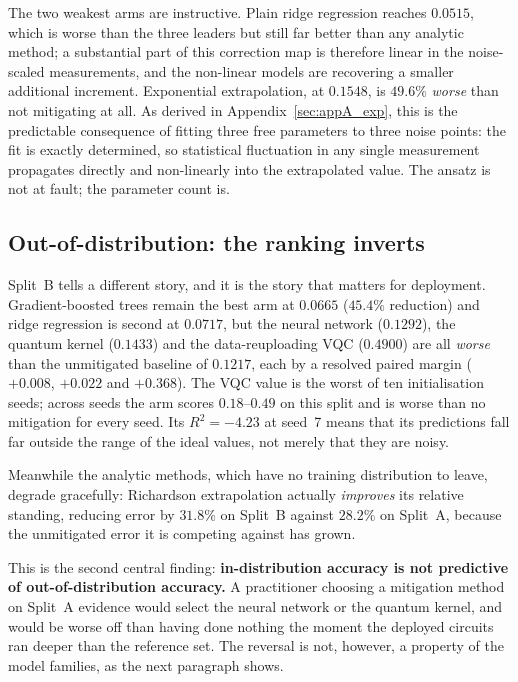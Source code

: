 \documentclass[Thesis.tex]{subfiles}
\begin{document}
The two weakest arms are instructive. Plain ridge regression reaches $0.0515$, which
is worse than the three leaders but still far better than any analytic method; a
substantial part of this correction map is therefore linear in the noise-scaled
measurements, and the non-linear models are recovering a smaller additional
increment. Exponential extrapolation, at $0.1548$, is $49.6\%$ \emph{worse} than not
mitigating at all. As derived in Appendix~\ref{sec:appA_exp}, this is the predictable
consequence of fitting three free parameters to three noise points: the fit is
exactly determined, so statistical fluctuation in any single measurement propagates
directly and non-linearly into the extrapolated value. The ansatz is not at fault;
the parameter count is.

\subsection{Out-of-distribution: the ranking inverts}

Split~B tells a different story, and it is the story that matters for deployment.
Gradient-boosted trees remain the best arm at $0.0665$ ($45.4\%$ reduction) and
ridge regression is second at $0.0717$, but the neural network ($0.1292$), the
quantum kernel ($0.1433$) and the data-reuploading VQC ($0.4900$) are all
\emph{worse} than the unmitigated baseline of $0.1217$, each by a resolved paired
margin ($+0.008$, $+0.022$ and $+0.368$). The VQC value is the worst of ten initialisation seeds; across seeds the arm
scores $0.18$--$0.49$ on this split and is worse than no mitigation for every seed.
Its $R^2 = -4.23$ at seed~7 means that its predictions fall far outside the range of
the ideal values, not merely that they are noisy.

Meanwhile the analytic methods, which have no training distribution to leave, degrade
gracefully: Richardson extrapolation actually \emph{improves} its relative standing,
reducing error by $31.8\%$ on Split~B against $28.2\%$ on Split~A, because the
unmitigated error it is competing against has grown.

This is the second central finding: \textbf{in-distribution accuracy is not
predictive of out-of-distribution accuracy.} A practitioner choosing a mitigation
method on Split~A evidence would select the neural network or the quantum kernel,
and would be worse off than having done nothing the moment the deployed circuits ran
deeper than the reference set. The reversal is not, however, a property of the model
families, as the next paragraph shows.
\end{document}

